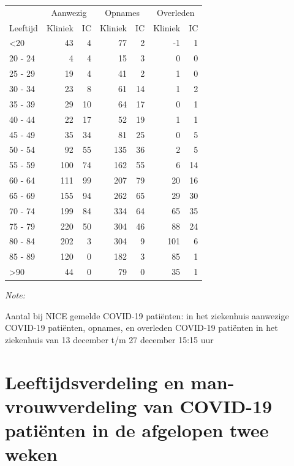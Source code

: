 \documentclass[
  english,
  man,floatsintext]{apa6}
\begin{document}
\begin{table}
\centering\begingroup\fontsize{10}{12}\selectfont

\begin{threeparttable}
\begin{tabular}{lrrrrrr}
\toprule
\multicolumn{1}{c}{ } & \multicolumn{2}{c}{Aanwezig} & \multicolumn{2}{c}{Opnames} & \multicolumn{2}{c}{Overleden} \\
\cmidrule(l{3pt}r{3pt}){2-3} \cmidrule(l{3pt}r{3pt}){4-5} \cmidrule(l{3pt}r{3pt}){6-7}
Leeftijd & Kliniek & IC & Kliniek & IC & Kliniek & IC\\
\midrule
<20 & 43 & 4 & 77 & 2 & -1 & 1\\
20 - 24 & 4 & 4 & 15 & 3 & 0 & 0\\
25 - 29 & 19 & 4 & 41 & 2 & 1 & 0\\
30 - 34 & 23 & 8 & 61 & 14 & 1 & 2\\
35 - 39 & 29 & 10 & 64 & 17 & 0 & 1\\
40 - 44 & 22 & 17 & 52 & 19 & 1 & 1\\
45 - 49 & 35 & 34 & 81 & 25 & 0 & 5\\
50 - 54 & 92 & 55 & 135 & 36 & 2 & 5\\
55 - 59 & 100 & 74 & 162 & 55 & 6 & 14\\
60 - 64 & 111 & 99 & 207 & 79 & 20 & 16\\
65 - 69 & 155 & 94 & 262 & 65 & 29 & 30\\
70 - 74 & 199 & 84 & 334 & 64 & 65 & 35\\
75 - 79 & 220 & 50 & 304 & 46 & 88 & 24\\
80 - 84 & 202 & 3 & 304 & 9 & 101 & 6\\
85 - 89 & 120 & 0 & 182 & 3 & 85 & 1\\
>90 & 44 & 0 & 79 & 0 & 35 & 1\\
\bottomrule
\end{tabular}
\begin{tablenotes}
\item \textit{Note: } 
\item Aantal bij NICE gemelde COVID-19 patiënten: in het ziekenhuis aanwezige COVID-19 patiënten, opnames, en overleden COVID-19 patiënten in het ziekenhuis van 13 december t/m 27 december 15:15 uur
\end{tablenotes}
\end{threeparttable}
\endgroup{}
\end{table}

\newpage

\hypertarget{leeftijdsverdeling-en-man-vrouwverdeling-van-covid-19-patiuxebnten-in-de-afgelopen-twee-weken}{%
\section{Leeftijdsverdeling en man-vrouwverdeling van COVID-19 patiënten in de afgelopen twee weken}\label{leeftijdsverdeling-en-man-vrouwverdeling-van-covid-19-patiuxebnten-in-de-afgelopen-twee-weken}}
\end{document}
